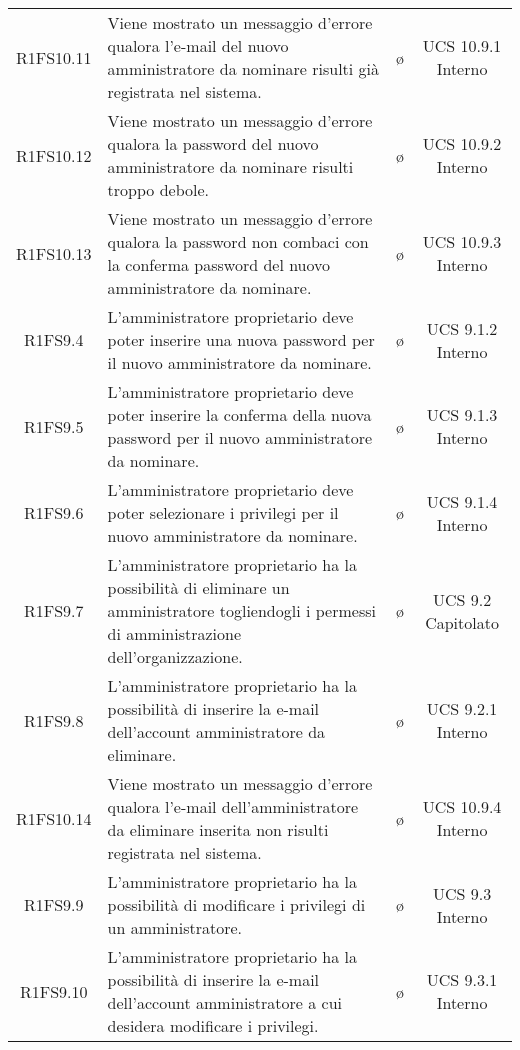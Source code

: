 {\begin{longtable}{ c C{6.5cm} c c}
R1FS10.11 & Viene mostrato un messaggio d'errore qualora l'e-mail del nuovo amministratore da nominare risulti già registrata nel sistema. & \o & UCS 10.9.1 Interno\\

R1FS10.12 & Viene mostrato un messaggio d'errore qualora la password del nuovo amministratore da nominare risulti troppo debole. & \o & UCS 10.9.2 Interno\\

R1FS10.13 & Viene mostrato un messaggio d'errore qualora la password non combaci con la conferma password del nuovo amministratore da nominare. & \o & UCS 10.9.3 Interno\\

R1FS9.4 & L'amministratore proprietario deve poter inserire una nuova password per il nuovo amministratore da nominare. & \o & UCS 9.1.2 Interno\\

R1FS9.5 & L'amministratore proprietario deve poter inserire la conferma della nuova password per il nuovo amministratore da nominare. & \o & UCS 9.1.3 Interno\\

R1FS9.6 & L'amministratore proprietario deve poter selezionare i privilegi per il nuovo amministratore da nominare. & \o & UCS 9.1.4 Interno\\

R1FS9.7 & L'amministratore proprietario ha la possibilità di eliminare un amministratore togliendogli i permessi di amministrazione dell'organizzazione. & \o & UCS 9.2 Capitolato\\

R1FS9.8 & L'amministratore proprietario ha la possibilità di inserire la e-mail dell'account amministratore da eliminare. & \o & UCS 9.2.1 Interno\\

R1FS10.14 & Viene mostrato un messaggio d'errore qualora l'e-mail dell'amministratore da eliminare inserita non risulti registrata nel sistema. & \o & UCS 10.9.4 Interno\\

R1FS9.9 & L'amministratore proprietario ha la possibilità di modificare i privilegi di un amministratore. & \o & UCS 9.3 Interno\\

R1FS9.10 & L'amministratore proprietario ha la possibilità di inserire la e-mail dell'account amministratore a cui desidera modificare i privilegi. & \o & UCS 9.3.1 Interno\\


\end{longtable}}
